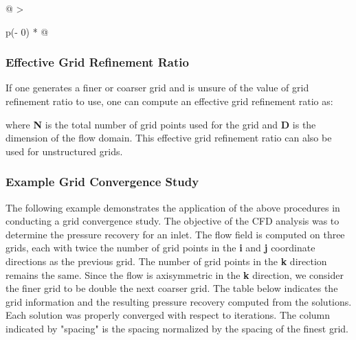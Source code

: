 \begin{longtable}[]{@{}
  >{\raggedright\arraybackslash}p{(\columnwidth - 0\tabcolsep) * }@{}}
\begin{minipage}[t]{\linewidth}

\hypertarget{effective-grid-refinement-ratio}{%
\subsubsection{Effective Grid Refinement
Ratio}\label{effective-grid-refinement-ratio}}

If one generates a finer or coarser grid and is unsure of the value of
grid refinement ratio to use, one can compute an effective grid
refinement ratio as:


where \textbf{N} is the total number of grid points used for the grid
and \textbf{D} is the dimension of the flow domain. This effective grid
refinement ratio can also be used for unstructured grids.

\hypertarget{example-grid-convergence-study}{%
\subsubsection{Example Grid Convergence
Study}\label{example-grid-convergence-study}}

The following example demonstrates the application of the above
procedures in conducting a grid convergence study. The objective of the
CFD analysis was to determine the pressure recovery for an inlet. The
flow field is computed on three grids, each with twice the number of
grid points in the \textbf{i} and \textbf{j} coordinate directions as
the previous grid. The number of grid points in the \textbf{k} direction
remains the same. Since the flow is axisymmetric in the \textbf{k}
direction, we consider the finer grid to be double the next coarser
grid. The table below indicates the grid information and the resulting
pressure recovery computed from the solutions. Each solution was
properly converged with respect to iterations. The column indicated by
"spacing" is the spacing normalized by the spacing of the finest grid.



\end{minipage}
\end{longtable}
